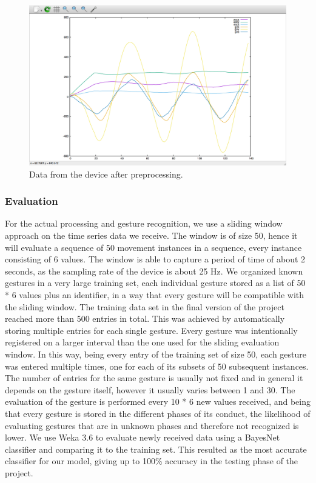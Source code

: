 \begin{figure}[h]
\centering
\includegraphics[width=1\columnwidth]{img/20}
\caption{Data from the device after preprocessing.}
\label{fig:figure3}
\end{figure}

\subsubsection{Evaluation}
For the actual processing and gesture recognition, we use a sliding window approach on the time series data we receive.
The window is of size 50, hence it will evaluate a sequence of 50 movement instances in a sequence,
every instance consisting of 6 values.
The window is able to capture a period of time of about 2 seconds, as the sampling rate of the device is about 25 Hz.
We organized known gestures in a very large training set, each individual gesture stored as a list of 50 * 6 values plus an identifier, in a way that every gesture will be compatible with the sliding window. 
The training data set in the final version of the project reached more than 500 entries in total.
This was achieved by automatically storing multiple entries for each single gesture.
Every gesture was intentionally registered on a larger interval than the one used for the sliding evaluation window.
In this way, being every entry of the training set of size 50,  each gesture was entered multiple times, one for each of its subsets of 50 subsequent instances.
The number of entries for the same gesture is usually not fixed and in general it depends on the gesture itself, however it usually varies between 1 and 30.
The evaluation of the gesture is performed every 10 * 6 new values received, and being that every gesture is stored in the different phases of its conduct, the likelihood of evaluating gestures that are in unknown phases and therefore not recognized is lower.
We use Weka 3.6 to evaluate newly received data using a BayesNet classifier and comparing it to the training set. 
This resulted as the most accurate classifier for our model, giving up to 100\% accuracy in the testing phase of the project.


